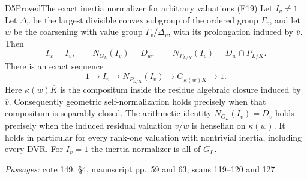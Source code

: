 \begin{result}{D5}{Proved}{The exact inertia normalizer for arbitrary valuations (F19)}
Let $I_v\ne1$. Let $\Delta_v$ be the largest divisible convex subgroup of the ordered group $\Gamma_v$, and let $w$ be the coarsening with value group $\Gamma_v/\Delta_v$, with its prolongation induced by $\overline v$. Then
\[
 I_w=I_v,\qquad N_{G_L}(I_v)=D_w,
 \qquad N_{P_{L/K}}(I_v)=D_w\cap P_{L/K}.
\]
There is an exact sequence
\[
 1\longrightarrow I_v\longrightarrow N_{P_{L/K}}(I_v)
 \longrightarrow G_{\kappa(w)\overline K}\longrightarrow1.
\]
Here $\kappa(w)\overline K$ is the compositum inside the residue algebraic closure induced by $\overline v$. Consequently geometric self-normalization holds precisely when that compositum is separably closed. The arithmetic identity $N_{G_L}(I_v)=D_v$ holds precisely when the induced residual valuation $v/w$ is henselian on $\kappa(w)$. It holds in particular for every rank-one valuation with nontrivial inertia, including every DVR. For $I_v=1$ the inertia normalizer is all of $G_L$.
\par\emph{Passages:} cote 149, \S4, manuscript pp.~59 and 63, scans 119--120 and 127.
\end{result}
